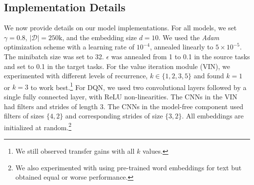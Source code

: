 \subsection{Implementation Details}
We now provide details on our model implementations. For all models, we set $\gamma = 0.8$, $|\mathcal{D}| = 250\text{k}$, and the embedding size $d = 10$. We used the \emph{Adam}~\cite{kingma2014adam} optimization scheme with a learning rate of $10^{-4}$, annealed linearly to $5 \times 10^{-5}$. The minibatch size was set to 32. $\epsilon$ was annealed from 1 to 0.1 in the source tasks and set to 0.1 in the target tasks. For the value iteration module (VIN), we experimented with different levels of recurrence, $k \in \{1,2,3,5\}$ and found $k=1$ or $k=3$ to work best.\footnote{We still observed transfer gains with all $k$ values.} For DQN, we used two convolutional layers followed by a single fully connected layer, with ReLU non-linearities. The CNNs in the VIN  had filters and strides of length 3. The CNNs in the model-free component used filters of sizes $\{4,2\}$ and corresponding strides of size $\{3,2\}$. All embeddings are initialized at random.\footnote{We also experimented with using pre-trained word embeddings for text but obtained equal or worse performance.}



